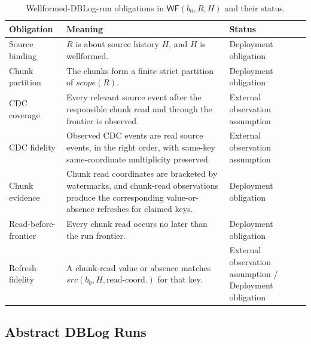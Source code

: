 \documentclass[letterpaper,10pt,twocolumn]{article}
\newcommand{\Src}{\mathit{src}}
\newcommand{\Scope}{\mathit{scope}}
\newcommand{\WF}{\mathsf{WF}}
\begin{document}
\begin{table}[t]
\caption{Wellformed-DBLog-run obligations in $\WF(b_0,R,H)$ and their status.}
\label{tab:wellformed-obligations}
\centering\small
\begin{tabularx}{\textwidth}{@{}p{1.45in}Yp{1.8in}@{}}
\toprule
\textbf{Obligation} & \textbf{Meaning} & \textbf{Status}\\
\midrule
Source binding &
  $R$ is about source history $H$, and $H$ is wellformed. &
  Deployment obligation\\
Chunk partition &
  The chunks form a finite strict partition of $\Scope(R)$. &
  Deployment obligation\\
CDC coverage &
  Every relevant source event after the responsible chunk read and
  through the frontier is observed. &
  External observation assumption\\
CDC fidelity &
  Observed CDC events are real source events, in the right order, with
  same-key same-coordinate multiplicity preserved. &
  External observation assumption\\
Chunk evidence &
  Chunk read coordinates are bracketed by watermarks, and chunk-read
  observations produce the corresponding value-or-absence refreshes for
  claimed keys. &
  Deployment obligation\\
Read-before-frontier &
  Every chunk read occurs no later than the run frontier. &
  Deployment obligation\\
Refresh fidelity &
  A chunk-read value or absence matches
  $\Src(b_0,H,\text{read-coord.})$ for that key. &
  External observation assumption / Deployment obligation\\
\bottomrule
\end{tabularx}
\end{table}

\subsection{Abstract DBLog Runs}\label{abstract-dblog-runs}
\end{document}
